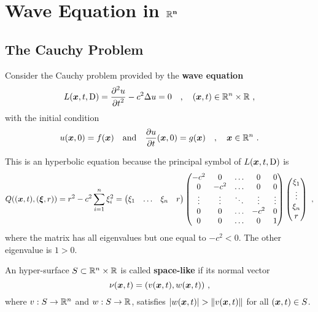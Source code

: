 \chapter{Wave Equation in $\mathbf{\mathbb{R}^n}$} \label{ChapWaveEqunD}

\section{The Cauchy Problem}

Consider the Cauchy problem provided by the
{\bfseries wave equation} 
\begin{equation} \label{wave_nD}
L({\bm{x}},t,\operatorname{D}) = \frac{\displaystyle \partial^{2}{u}} {\displaystyle \partial t^{2}} - c^2 \Delta u = 0 \quad ,
\quad ({\bm{x}},t) \in \mathbb{R}^n \times \mathbb{R} \ ,
\end{equation}
with the initial condition
\begin{equation} \label{wave_nD_cond}
u({\bm{x}}, 0) = f({\bm{x}}) \quad \text{and} \quad
\frac{\partial{u}}{\partial t}({\bm{x}},0) = g({\bm{x}}) \quad , \quad
{\bm{x}} \in \mathbb{R}^n \ .
\end{equation}

This is an hyperbolic equation because the principal symbol of
$L({\bm{x}},t,\operatorname{D})$ is
\[
Q(({\bm{x}},t), ({\bm{\xi}},r)) = r^2 - c^2 \sum_{i=1}^n \xi_i^2 =
\begin{pmatrix}
\xi_1 & \ldots & \xi_n & r
\end{pmatrix}
\begin{pmatrix}
-c^2 & 0 & \ldots & 0 & 0 \\
0 & -c^2 & \ldots & 0 & 0 \\
\vdots & \vdots & \ddots & \vdots & \vdots \\
0 & 0 & \ldots & -c^2 & 0 \\
0 & 0 & \ldots & 0 & 1 \\
\end{pmatrix}
\begin{pmatrix}
\xi_1 \\ \vdots \\ \xi_n \\ r
\end{pmatrix}
\ ,
\]
where the matrix has all eigenvalues but one equal to $-c^2 <0$.  The
other eigenvalue is $1>0$.
\begin{defn}
An hyper-surface $S \subset \mathbb{R}^n \times \mathbb{R}$ is called
{\bfseries space-like} if its normal vector
\[
\nu({\bm{x}},t) = (v({\bm{x}},t),w({\bm{x}},t) ) \ ,
\]
where $v:S \to \mathbb{R}^n$ and $w:S \to \mathbb{R}$,
satisfies $|w({\bm{x}},t)| > \|v({\bm{x}},t) \|$ for all
$({\bm{x}},t) \in S$.
\end{defn}

